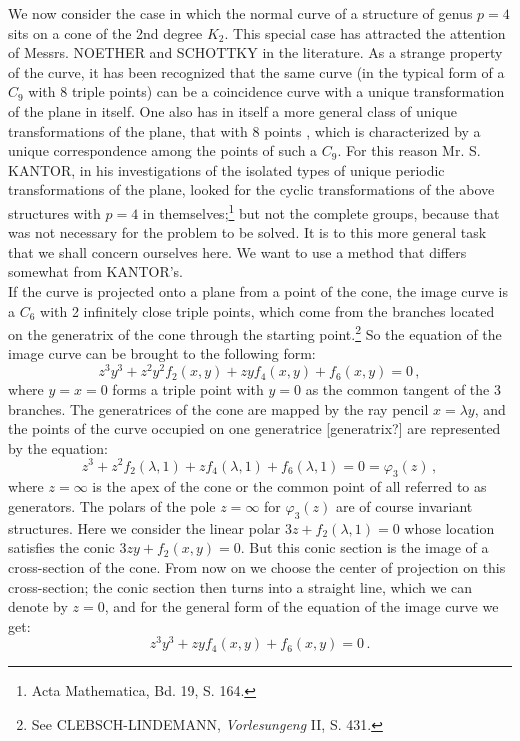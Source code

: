 \documentclass[leqno]{article}
\begin{document}
We now consider the case in which the normal curve of a structure of genus $p=4$ sits on a cone of the 2nd degree $K_2$. This special case has attracted the attention of Messrs. NOETHER and SCHOTTKY in the literature. As a strange property of the curve, it has been recognized that the same curve (in the typical form of a $C_9$ with 8 triple points) can be a coincidence curve with a unique transformation of the plane in itself. One also has in itself a more general class of unique transformations of the plane, that \guillemotright with 8 points \guillemotright, which is characterized by a unique correspondence among the points  of such a $C_9$. For this reason Mr. S. KANTOR, in his investigations of the isolated types of unique periodic transformations of the plane, looked for the cyclic transformations of the above structures with $p=4$ in themselves;\footnote{Acta Mathematica, Bd. 19, S. 164.} but not the complete groups, because that was not necessary for the problem to be solved. It is to this more general task that we shall concern ourselves here. We want to use a method that differs somewhat from KANTOR's. \\
If the curve is projected onto a plane from a point of the cone, the image curve is a $C_6$ with 2 infinitely close triple points, which come from the branches located on the generatrix of the cone through the starting point.\footnote{See CLEBSCH-LINDEMANN, \textit{Vorlesungeng} II, S. 431.} So the equation of the image curve can be brought to the following form: 
\[
z^3 y^3 + z^2 y^2 f_2(x,y) + zy f_4(x,y)+ f_6(x,y) = 0 \, , 
\]
where $y=x=0$ forms a triple point with $y=0$ as the common tangent of the 3 branches. The generatrices of the cone are mapped by the ray pencil $x=\lambda y$, and the points of the curve occupied on one generatrice [generatrix?] are represented by the equation: 
\[
z^3 + z^2 f_2(\lambda, 1) + z f_4(\lambda, 1) + f_6(\lambda, 1) = 0 = \varphi_3(z) \, , 
\] 
where $z=\infty$ is the apex of the cone or the common point of all referred to as generators. The polars of the pole $z=\infty$ for $\varphi_3(z)$ are of course invariant structures. Here we consider the linear polar $3z + f_2(\lambda, 1)=0$ whose location satisfies the conic $3zy+f_2(x,y)=0$. But this conic section is the image of a cross-section of the cone. From now on we choose the center of projection on this cross-section; the conic section then turns into a straight line, which we can denote by $z=0$, and for the general form of the equation of the image curve we get:
\begin{equation}\label{eq: 8.I}
z^3 y^3 + zy f_4(x,y) + f_6(x,y) = 0 \, . \tag{I}
\end{equation}
\end{document}
